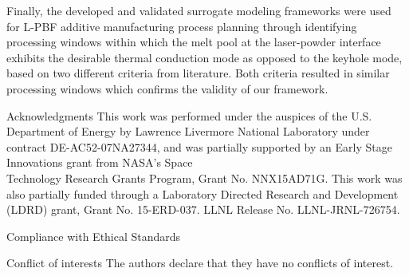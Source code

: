 \documentclass[10pt]{article}
\begin{document}
Finally, the developed and validated surrogate modeling frameworks were used for L-PBF additive manufacturing process planning through identifying processing windows within which the melt pool at the laser-powder interface exhibits the desirable thermal conduction mode as opposed to the keyhole mode, based on two different criteria from literature. Both criteria resulted in similar processing windows which confirms the validity of our framework.

Acknowledgments This work was performed under the auspices of the U.S. Department of Energy by Lawrence Livermore National Laboratory under contract DE-AC52-07NA27344, and was partially supported by an Early Stage Innovations grant from NASA's Space\\
Technology Research Grants Program, Grant No. NNX15AD71G. This work was also partially funded through a Laboratory Directed Research and Development (LDRD) grant, Grant No. 15-ERD-037. LLNL Release No. LLNL-JRNL-726754.

Compliance with Ethical Standards

Conflict of interests The authors declare that they have no conflicts of interest.
\end{document}
